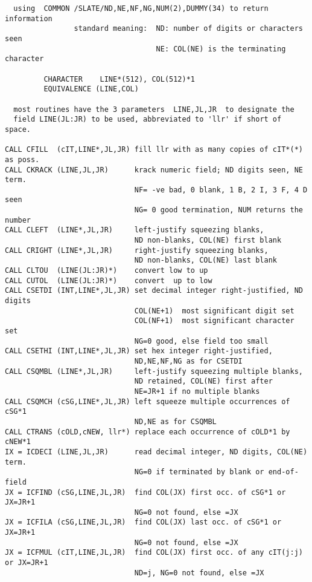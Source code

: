 \begin{verbatim}
  using  COMMON /SLATE/ND,NE,NF,NG,NUM(2),DUMMY(34) to return information
                standard meaning:  ND: number of digits or characters seen
                                   NE: COL(NE) is the terminating character

         CHARACTER    LINE*(512), COL(512)*1
         EQUIVALENCE (LINE,COL)

  most routines have the 3 parameters  LINE,JL,JR  to designate the
  field LINE(JL:JR) to be used, abbreviated to 'llr' if short of space.

CALL CFILL  (cIT,LINE*,JL,JR) fill llr with as many copies of cIT*(*) as poss.
CALL CKRACK (LINE,JL,JR)      krack numeric field; ND digits seen, NE term.
                              NF= -ve bad, 0 blank, 1 B, 2 I, 3 F, 4 D seen
                              NG= 0 good termination, NUM returns the number
CALL CLEFT  (LINE*,JL,JR)     left-justify squeezing blanks,
                              ND non-blanks, COL(NE) first blank
CALL CRIGHT (LINE*,JL,JR)     right-justify squeezing blanks,
                              ND non-blanks, COL(NE) last blank
CALL CLTOU  (LINE(JL:JR)*)    convert low to up
CALL CUTOL  (LINE(JL:JR)*)    convert  up to low
CALL CSETDI (INT,LINE*,JL,JR) set decimal integer right-justified, ND digits
                              COL(NE+1)  most significant digit set
                              COL(NF+1)  most significant character set
                              NG=0 good, else field too small
CALL CSETHI (INT,LINE*,JL,JR) set hex integer right-justified,
                              ND,NE,NF,NG as for CSETDI
CALL CSQMBL (LINE*,JL,JR)     left-justify squeezing multiple blanks,
                              ND retained, COL(NE) first after
                              NE=JR+1 if no multiple blanks
CALL CSQMCH (cSG,LINE*,JL,JR) left squeeze multiple occurrences of cSG*1
                              ND,NE as for CSQMBL
CALL CTRANS (cOLD,cNEW, llr*) replace each occurrence of cOLD*1 by cNEW*1
IX = ICDECI (LINE,JL,JR)      read decimal integer, ND digits, COL(NE) term.
                              NG=0 if terminated by blank or end-of-field
JX = ICFIND (cSG,LINE,JL,JR)  find COL(JX) first occ. of cSG*1 or JX=JR+1
                              NG=0 not found, else =JX
JX = ICFILA (cSG,LINE,JL,JR)  find COL(JX) last occ. of cSG*1 or JX=JR+1
                              NG=0 not found, else =JX
JX = ICFMUL (cIT,LINE,JL,JR)  find COL(JX) first occ. of any cIT(j:j) or JX=JR+1
                              ND=j, NG=0 not found, else =JX

\end{verbatim}
